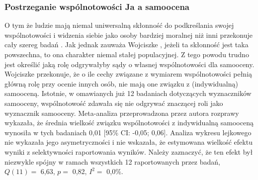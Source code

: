 \documentclass[man]{apa6}
\begin{document}
\subsubsection{Postrzeganie wspólnotowości Ja a samoocena}

O tym że ludzie mają niemal uniwersalną skłonność do podkreślania swojej wspólnotowości i widzenia siebie jako osoby bardziej moralnej niż inni przekonuje cały szereg badań \parencite[np.,][]{allison1989being, van1998being, epley2000feeling, balcetis2008collectivists, paulhus1998egoistic}. Jak jednak zauważa Wojciszke \parencite[np.,]{wojciszke2010sprawczosc}, jeżeli ta skłonność jest taka powszechna, to ona charakter niemal stałej populacyjnej. Z tego powodu trudno jest określić jaką rolę odgrywałyby sądy o własnej wspólnotowości dla samooceny.\\

Wojciszke \parencite[np.,][]{wojciszke2006perspektywa} przekonuje, że o ile cechy związane z wymiarem wspólnotowości pełnią główną rolę przy ocenie innych osób, nie mają one związku z (indywidualną) samooceną. Istotnie, w omawianych już 12 badaniach dotyczących wyznaczników samooceny, wspólnotowość zdawała się nie odgrywać znaczącej roli jako wyznacznik samooceny. Meta-analiza przeprowadzona przez autora rozprawy wykazała, że średnia wielkość związku wspólnotowości z indywidualną samooceną wynosiła w tych badaniach 0,01 [95\% CI: -0,05; 0,06]. Analiza wykresu lejkowego nie wykazała jego asymetryczności i nie wskazała, że estymowana wielkość efektu wyniki z selektywności raportowania wyników. Należy zaznaczyć, że ten efekt był niezwykle spójny w ramach wszystkich 12 raportowanych przez \textcite{wojciszke2010sprawczosc} badań, $Q(11) = $ 6,63, $p = $ 0,82, $I^2 = $ 0,0\%. \\
\end{document}
